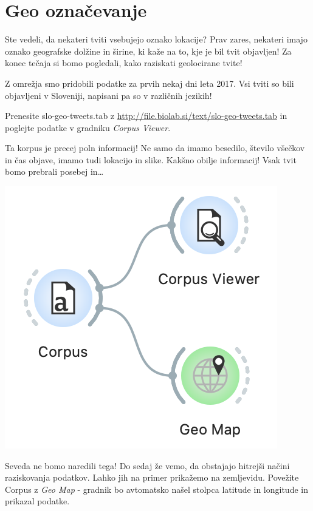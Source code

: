 \chapter{Geo označevanje}
\label{ch:geo-oznacevanje}

Ste vedeli, da nekateri tviti vsebujejo oznako lokacije? Prav zares, nekateri imajo oznako geografske dolžine in širine, ki kaže na to, kje je bil tvit objavljen! Za konec tečaja si bomo pogledali, kako raziskati geolocirane tvite!

Z omrežja smo pridobili podatke za prvih nekaj dni leta 2017. Vsi tviti so bili objavljeni v Sloveniji, napisani pa so v različnih jezikih!

Prenesite slo-geo-tweets.tab z \url{http://file.biolab.si/text/slo-geo-tweets.tab} in poglejte podatke v gradniku \textit{Corpus Viewer}.

Ta korpus je precej poln informacij! Ne samo da imamo besedilo, število všečkov in čas objave, imamo tudi lokacijo in slike. Kakšno obilje informacij! Vsak tvit bomo prebrali posebej in…

\begin{marginfigure}[0cm]
    \includegraphics[width=\linewidth]{geo-workflow.png}
    \caption{}
\end{marginfigure}

Seveda ne bomo naredili tega! Do sedaj že vemo, da obstajajo hitrejši načini raziskovanja podatkov. Lahko jih na primer prikažemo na zemljevidu. Povežite Corpus z \textit{Geo Map} - gradnik bo avtomatsko našel stolpca latitude in longitude in prikazal podatke.


